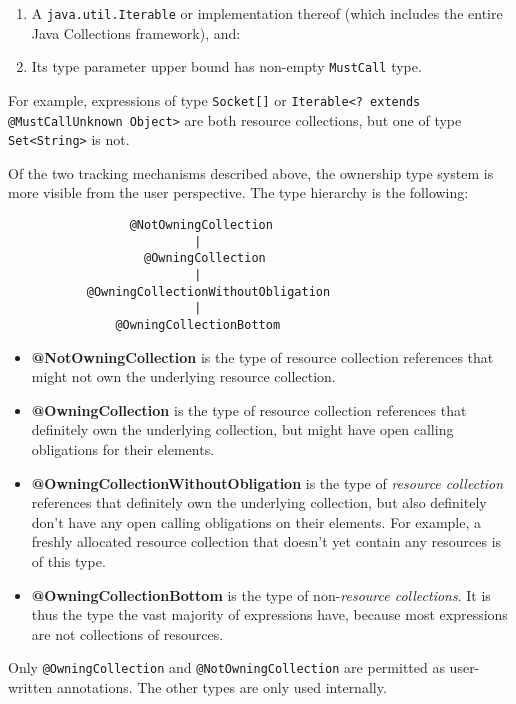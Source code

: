 \begin{enumerate}
  \item A \texttt{java.util.Iterable} or implementation thereof (which includes the entire Java Collections framework), and:%
  \item Its type parameter upper bound has non-empty \texttt{MustCall} type.
\end{enumerate}

For example, expressions of type \texttt{Socket[]} or \texttt{Iterable<? extends @MustCallUnknown Object>} are both resource collections, but one of type \texttt{Set<String>} is not.

Of the two tracking mechanisms described above, the ownership type system is more visible from the user perspective. The type hierarchy is the following:

\begin{verbatim}
                 @NotOwningCollection
                          |
                   @OwningCollection
                          |
           @OwningCollectionWithoutObligation
                          |
               @OwningCollectionBottom
\end{verbatim}

\begin{itemize}
  \item \textbf{@NotOwningCollection} is the type of resource collection references that might not own the underlying resource collection.
  \item \textbf{@OwningCollection} is the type of resource collection references that definitely own the underlying collection, but might have open calling obligations for their elements.
  \item \textbf{@OwningCollectionWithoutObligation} is the type of \textit{resource collection} references that definitely own the underlying collection, but also definitely don't have any open calling obligations on their elements. For example, a freshly allocated resource collection that doesn't yet contain any resources is of this type.
  \item \textbf{@OwningCollectionBottom} is the type of non-\textit{resource collections}. It is thus the type the vast majority of expressions have, because most expressions are not collections of resources.
\end{itemize}

Only \texttt{@OwningCollection} and \texttt{@NotOwningCollection} are permitted as user-written annotations. The other types are only used internally.

